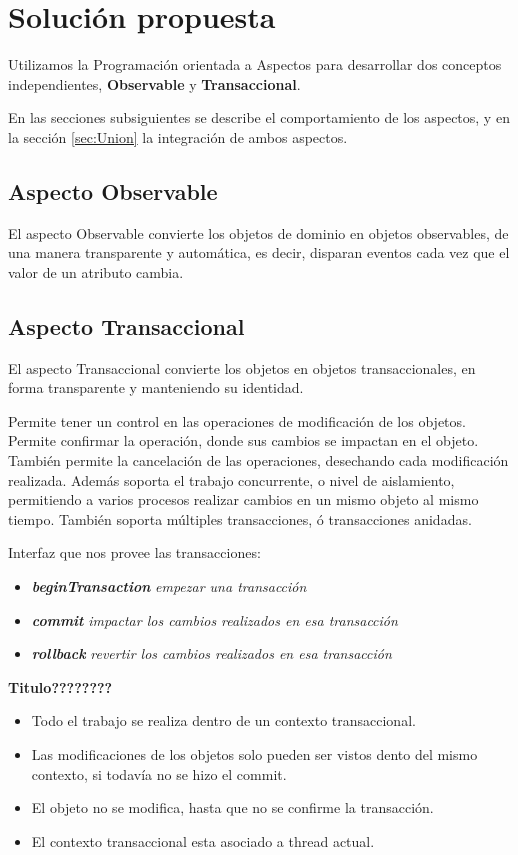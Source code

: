 \section{Solución propuesta}
\label{sec:Solucion}

Utilizamos la Programación orientada a Aspectos para desarrollar dos
conceptos independientes, {\bf Observable} y  {\bf Transaccional}.

En las secciones subsiguientes se describe el comportamiento de los aspectos, y
en la sección \ref{sec:Union} la integración de ambos aspectos.

\subsection{Aspecto Observable}
	El aspecto Observable convierte los objetos de dominio en objetos observables,
	de una manera transparente y automática, es decir, disparan eventos cada vez
	que el valor de un atributo cambia.

\subsection{Aspecto Transaccional}
	El aspecto Transaccional convierte los objetos en objetos
	transaccionales, en forma transparente  y manteniendo su identidad.
	
	Permite tener un control en las operaciones de modificación de los objetos.
	Permite confirmar la operación, donde sus cambios se impactan en el objeto.
	También permite la cancelación de las operaciones, desechando cada
	modificación realizada. Además soporta el trabajo concurrente, o nivel de
	aislamiento, permitiendo a varios procesos realizar cambios en un mismo objeto
	al mismo tiempo. También soporta múltiples transacciones, ó transacciones
	anidadas.
	
	\bigskip
	
	Interfaz que nos provee las transacciones:
	
	\begin{itemize}
	  \item {\bf \emph{beginTransaction}}  \emph{empezar una transacción}
	  \item {\bf \emph{commit}} \emph{impactar los cambios realizados en esa
	  transacción}
	  \item {\bf \emph{rollback}} \emph{revertir los cambios realizados en esa
	  transacción}
	\end{itemize}


	{\bf Titulo????????}
	\begin{itemize}
	  \item Todo el trabajo se realiza dentro de un contexto transaccional.
	  
	  \item Las modificaciones de los objetos solo pueden ser vistos dento del
	  mismo contexto, si todavía no se hizo el commit.
	   
	  \item El objeto no se modifica, hasta que no se confirme la transacción.
	  
	   \item El contexto transaccional esta asociado a thread actual.
	\end{itemize}


